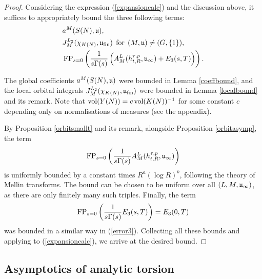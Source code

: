 \begin{proof}
    Considering the expression (\ref{expansioncalc}) and the discussion above, it suffices to appropriately bound the three following terms:
    \begin{align*}
        &a^M(S(N),\mathfrak{u}), \\
        & J_M^{L_2}(\chi_{K(N)},\mathfrak{u}_{\text{fin}}) \:\: \text{for} \:\:(M,\mathfrak{u})\neq (G,\lbrace1\rbrace), \\
        &\operatorname{FP}_{s=0}\left(\frac{1}{s\Gamma(s)}\left(A_M^{L}(h^{\tau,p}_{t,R},\mathfrak{u}_\infty)+E_3(s,T)\right)\right).
    \end{align*}

    \noindent The global coefficients $a^M(S(N),\mathfrak{u})$ were bounded in Lemma \ref{coeffbound}, and the local orbital integrals $J_M^{L_2}(\chi_{K(N)},\mathfrak{u}_{\text{fin}})$ were bounded in Lemma \ref{localbound} and its remark. Note that $\operatorname{vol}(Y(N))=c\operatorname{vol}(K(N))^{-1}$ for some constant $c$ depending only on normalisations of measures (see the appendix).

    By Proposition \ref{orbitsmallt} and its remark, alongside Proposition \ref{orbitasymp}, the term 
    $$\operatorname{FP}_{s=0}\left(\frac{1}{s\Gamma(s)}A_M^{L}(h^{\tau,p}_{t,R},\mathfrak{u}_\infty)\right)$$
    is uniformly bounded by a constant times $R^a(\log R)^b$, following the theory of Mellin transforms. The bound can be chosen to be uniform over all $(L,M,\mathfrak{u}_\infty)$, as there are only finitely many such triples. Finally, the term
    $$\operatorname{FP}_{s=0}\left(\frac{1}{s\Gamma(s)}E_3(s,T)\right) = E_3(0,T)$$ 
    was bounded in a similar way in (\ref{error3}). Collecting all these bounds and applying to (\ref{expansioncalc}), we arrive at the desired bound.    
\end{proof}


\subsection{Asymptotics of analytic torsion}

